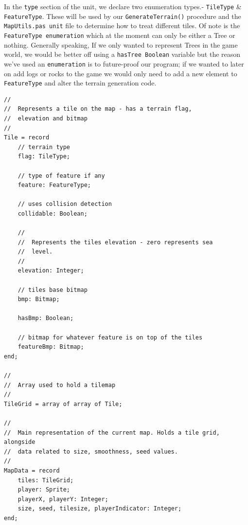 \documentclass{article}
\begin{document}
In the \texttt{type} section of the unit, we declare two enumeration types.- \texttt{TileType} \& \texttt{FeatureType}. These will be used by our \texttt{GenerateTerrain()} procedure and the \texttt{MapUtils.pas unit} file to determine how to treat different tiles. Of note is the \texttt{FeatureType enumeration} which at the moment can only be either a Tree or nothing. Generally speaking, If we only wanted to represent Trees in the game world, we would be better off using a \texttt{hasTree Boolean} variable but the reason we've used an \texttt{enumeration} is to future-proof our program; if we wanted to later on add logs or rocks to the game we would only need to add a new element to \texttt{FeatureType} and alter the terrain generation code.
\vspace{5mm}
\begin{mdframed}[backgroundcolor=darkgray]
\begin{verbatim}
//
//	Represents a tile on the map - has a terrain flag,
//	elevation and bitmap
//
Tile = record
	// terrain type
	flag: TileType;

	// type of feature if any
	feature: FeatureType;

	// uses collision detection
	collidable: Boolean;

	//
	//	Represents the tiles elevation - zero represents sea
	//	level.
	//
	elevation: Integer;

	// tiles base bitmap
	bmp: Bitmap;

	hasBmp: Boolean;

	// bitmap for whatever feature is on top of the tiles
	featureBmp: Bitmap;
end;

//
//	Array used to hold a tilemap
//
TileGrid = array of array of Tile;

//
//	Main representation of the current map. Holds a tile grid, alongside
//	data related to size, smoothness, seed values.
//
MapData = record
	tiles: TileGrid;
	player: Sprite;
	playerX, playerY: Integer;
	size, seed, tilesize, playerIndicator: Integer;
end;
\end{verbatim}
\end{mdframed}
\end{document}
